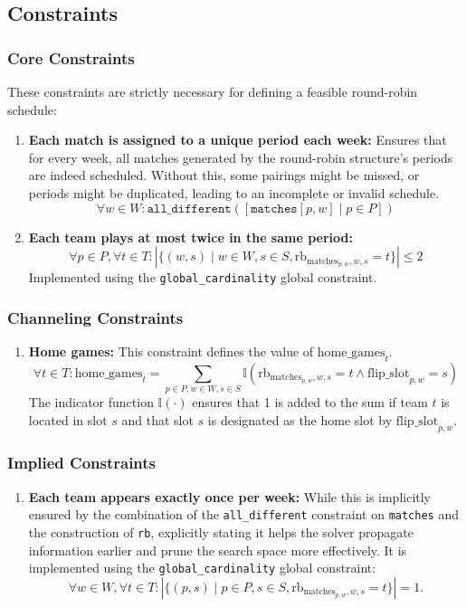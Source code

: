 \subsection{Constraints}
\subsubsection{Core Constraints}
These constraints are strictly necessary for defining a feasible round-robin schedule:
\begin{enumerate}
    \item \textbf{Each match is assigned to a unique period each week:} Ensures that for every week, all matches generated by the round-robin structure's periods are indeed scheduled. Without this, some pairings might be missed, or periods might be duplicated, leading to an incomplete or invalid schedule.
    \[ \forall w \in W : \texttt{all\_different}([\texttt{matches}[p, w] \mid p \in P]) \]

    \item \textbf{Each team plays at most twice in the same period:} 
\[ \forall p \in P, \forall t \in T : \left| \{ (w, s) \mid w \in W, s \in S, \text{rb}_{\text{matches}_{p, w}, w, s} = t \} \right| \leq 2 \]
Implemented using the \texttt{global\_cardinality} global constraint.

\end{enumerate}

\subsubsection{Channeling Constraints}
\begin{enumerate}
 \item \textbf{Home games:} This constraint defines the value of $\text{home\_games}_{t}$.
\[ \forall t \in T : \text{home\_games}_{t} = \sum_{p \in P, w \in W, s \in S} \mathbb{I}\left( \text{rb}_{\text{matches}_{p, w}, w, s} = t \land \text{flip\_slot}_{p, w} = s \right) \]
The indicator function $\mathbb{I}(\cdot)$ ensures that 1 is added to the sum if team $t$ is located in slot $s$ and that slot $s$ is designated as the home slot by $\text{flip\_slot}_{p,w}$.
\end{enumerate}


\subsubsection{Implied Constraints}
\begin{enumerate}
   \item \textbf{Each team appears exactly once per week:}  While this is implicitly ensured by the combination of the \texttt{all\_different} constraint on \texttt{matches} and the construction of \texttt{rb}, explicitly stating it helps the solver propagate information earlier and prune the search space more effectively.  It is implemented using the \texttt{global\_cardinality} global constraint:
    \[
     \forall w \in W, \forall t \in T : \left| \{ (p, s) \mid p \in P, s \in S, \text{rb}_{\text{matches}_{p, w}, w, s} = t \} \right| = 1.
 \]
\end{enumerate}



